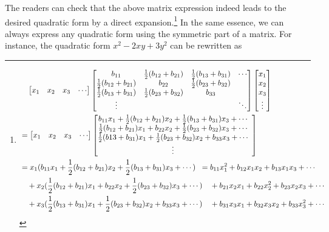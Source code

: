 The readers can check that the above matrix expression indeed leads to the desired quadratic form by a direct expansion.\footnote{\begin{align*}
&\quad \begin{bmatrix}
x_1 & x_2 & x_3 & \cdots
\end{bmatrix}
\left[\begin{array}{@{}cccc@{}}
b_{11} & \frac{1}{2}(b_{12} + b_{21}) & \frac{1}{2}(b_{13} + b_{31}) & \cdots \\
\frac{1}{2}(b_{12} + b_{21}) & b_{22} & \frac{1}{2}(b_{23} + b_{32}) &  \\
\frac{1}{2}(b_{13} + b_{31}) & \frac{1}{2}(b_{23} + b_{32}) & b_{33} &  \\
\vdots & & & \ddots
\end{array}\right]
\begin{bmatrix}
x_1 \\
x_2 \\
x_3 \\
\vdots
\end{bmatrix} \\
&=
\begin{bmatrix}
x_1 & x_2 & x_3 & \cdots
\end{bmatrix}
\left[\begin{array}{@{}cccc@{}}
b_{11}x_1 + \frac{1}{2}(b_{12} + b_{21})x_2 + \frac{1}{2}(b_{13} + b_{31})x_3 + \cdots \\
\frac{1}{2}(b_{12} + b_{21})x_1 + b_{22}x_2 + \frac{1}{2}(b_{23} + b_{32})x_3 + \cdots \\
\frac{1}{2}(b{13} + b_{31})x_1 + \frac{1}{2}(b_{23} + b_{32})x_2 + b_{33}x_3 + \cdots \\
\vdots 
\end{array}\right] \\
&= x_1(b_{11}x_1 + \frac{1}{2}(b_{12} + b_{21})x_2 + \frac{1}{2}(b_{13} + b_{31})x_3 + \cdots) \;\; = b_{11}x_1^2 + b_{12}x_1x_2 + b_{13}x_1x_3 + \cdots \\
&\quad + x_2(\frac{1}{2}(b_{12} + b_{21})x_1 + b_{22}x_2 + \frac{1}{2}(b_{23} + b_{32})x_3 + \cdots) \quad + b_{21}x_2x_1 + b_{22}x_2^2 + b_{23}x_2x_3 + \cdots \\
&\quad + x_3(\frac{1}{2}(b_{13} + b_{31})x_1 + \frac{1}{2}(b_{23} + b_{32})x_2 + b_{33}x_3 + \cdots) \quad + b_{31}x_3x_1 + b_{32}x_3x_2 + b_{33}x_3^2 + \cdots 
\end{align*}} In the same essence, we can always express any quadratic form using the symmetric part of a matrix. For instance, the quadratic form $x^2 - 2xy + 3y^2$ can be rewritten as

